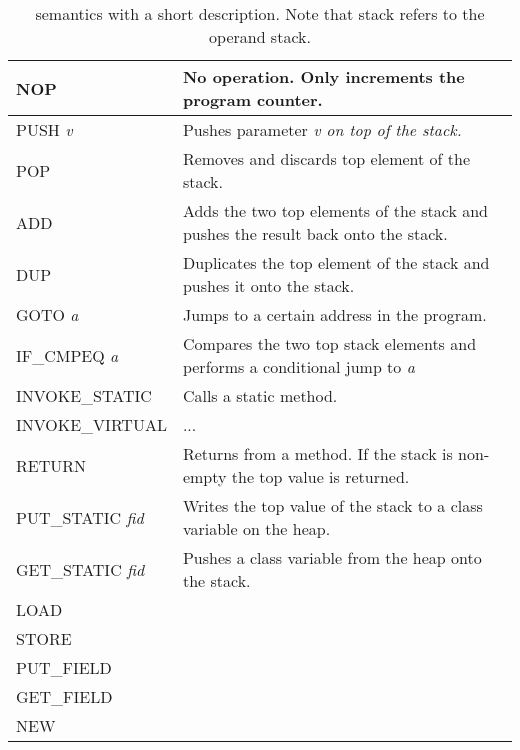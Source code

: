 \section{\jcl}
\begin{table}[]
\centering
\label{tab:instr}
\begin{tabular}{l|l}
\hline
NOP             		  & No operation. Only increments the program counter. \\ \hline
PUSH \textit{v}           & Pushes parameter \textit{v on top of the stack.} \\ \hline
POP             		  & Removes and discards top element of the stack.\\ \hline
ADD             		  & Adds the two top elements of the stack and pushes the result back onto the stack.  \\ \hline
DUP             		  & Duplicates the top element of the stack and pushes it onto the stack. \\ \hline
GOTO \textit{a}           & Jumps to a certain address in the program.  \\ \hline
IF\_CMPEQ \textit{a}   	  & Compares the two top stack elements and performs a conditional jump to \textit{a}  \\ \hline
INVOKE\_STATIC     		  & Calls a static method.  \\ \hline
INVOKE\_VIRTUAL 		  & ...  \\ \hline
RETURN                    & Returns from a method. If the stack is non-empty the top value is returned.   \\ \hline
PUT\_STATIC \textit{fid}  & Writes the top value of the stack to a class variable on the heap.  \\ \hline
GET\_STATIC \textit{fid}  & Pushes a class variable from the heap onto the stack. \\ \hline
LOAD            &   \\ \hline
STORE           &   \\ \hline
PUT\_FIELD      &   \\ \hline
GET\_FIELD      &   \\ \hline
NEW             &   \\ \hline  
\end{tabular}
\caption{\jcl semantics with a short description. Note that stack refers to the operand stack.}
\end{table}